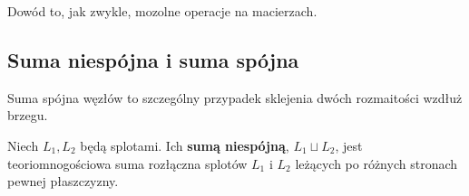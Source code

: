 Dowód to, jak zwykle, mozolne operacje na macierzach.


\subsection{Suma niespójna i suma spójna} %
\label{sub:knot_sum}
Suma spójna węzłów to szczególny przypadek sklejenia dwóch rozmaitości wzdłuż brzegu.

\begin{definition}
    Niech $L_1, L_2$ będą splotami.
    Ich \textbf{sumą niespójną}, $L_1 \sqcup L_2$,
    jest teoriomnogościowa suma rozłączna splotów
    $L_1$ i $L_2$ leżących po różnych stronach pewnej płaszczyzny.
\end{definition}

